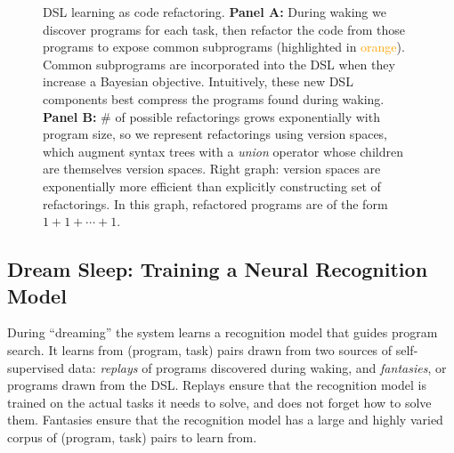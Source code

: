 \documentclass{article}
\newcommand{\code}[1]{{\footnotesize\texttt{#1}}}
\newcommand{\orange}[1]{\textcolor{orange}{#1}}
\begin{document}
\begin{figure}
  \caption{DSL learning as code refactoring. \textbf{Panel A:} During waking we discover programs for each task, then refactor the code from those programs to expose common subprograms (highlighted in \orange{orange}). Common subprograms are incorporated into the DSL when they increase a Bayesian objective. Intuitively, these new DSL components best compress the programs found during waking. \textbf{Panel B:} \# of possible refactorings grows exponentially with program size, so we represent refactorings using version spaces, which augment syntax trees with a \emph{union} operator whose children are themselves version spaces. Right graph: version spaces are exponentially more efficient than explicitly constructing set of refactorings. In this graph, refactored programs are of the form $1+1+\cdots  + 1$.}\label{mapFactor}
\end{figure}


\subsection{Dream Sleep: Training a Neural Recognition Model}\label{recognitionSection}

During ``dreaming'' the system learns a recognition model that guides
program search.  It learns from (program, task) pairs drawn from two
sources of self-supervised data: \emph{replays} of programs discovered
during waking, and \emph{fantasies}, or programs drawn from the DSL.
Replays ensure that the recognition model is trained on the actual
tasks it needs to solve, and does not forget how to solve them.
Fantasies ensure that the recognition model has a large and highly
varied corpus of (program, task) pairs to learn from.
\end{document}
